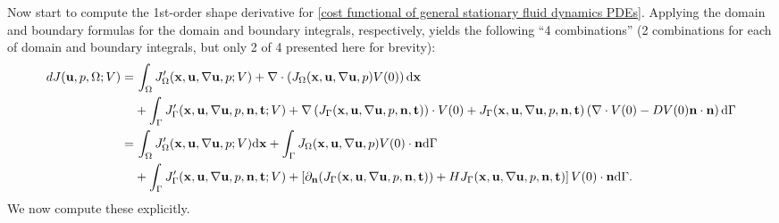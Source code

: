 \documentclass[oneside]{book}
\numberwithin{equation}{section}
\begin{document}
Now start to compute the 1st-order shape derivative for \eqref{cost functional of general stationary fluid dynamics PDEs}. Applying the domain and boundary formulas for the domain and boundary integrals, respectively, yields the following ``4 combinations'' (2 combinations for each of domain and boundary integrals, but only 2 of 4 presented here for brevity):
\begin{align*}
    dJ({\bf u},p,\Omega;V) =&\, \int_\Omega J_\Omega'({\bf x},{\bf u},\nabla{\bf u},p;V) + \nabla\cdot\left(J_\Omega({\bf x},{\bf u},\nabla{\bf u},p)V(0)\right){\rm d}{\bf x}\\
    &+ \int_\Gamma J_\Gamma'({\bf x},{\bf u},\nabla{\bf u},p,{\bf n},{\bf t};V) + \nabla\left(J_\Gamma({\bf x},{\bf u},\nabla{\bf u},p,{\bf n},{\bf t})\right)\cdot V(0) + J_\Gamma({\bf x},{\bf u},\nabla{\bf u},p,{\bf n},{\bf t})\left(\nabla\cdot V(0) - DV(0){\bf n}\cdot{\bf n}\right){\rm d}\Gamma\\
    =&\, \int_\Omega J_\Omega'({\bf x},{\bf u},\nabla{\bf u},p;V){\rm d}{\bf x} + \int_\Gamma J_\Omega({\bf x},{\bf u},\nabla{\bf u},p)V(0)\cdot{\bf n}{\rm d}\Gamma\\
    &+ \int_\Gamma J_\Gamma'({\bf x},{\bf u},\nabla{\bf u},p,{\bf n},{\bf t};V) + \left[\partial_{\bf n}(J_\Gamma({\bf x},{\bf u},\nabla{\bf u},p,{\bf n},{\bf t})) + HJ_\Gamma({\bf x},{\bf u},\nabla{\bf u},p,{\bf n},{\bf t})\right]V(0)\cdot{\bf n}{\rm d}\Gamma.
\end{align*}
We now compute these explicitly.
\end{document}
